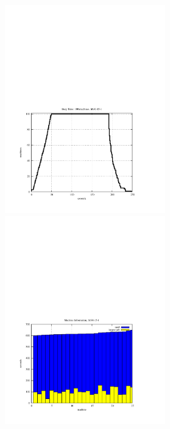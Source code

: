 \documentclass{l4proj}
\begin{document}
\begin{figure}
\begin{center}
\begin{minipage}[t]{0.30\textwidth}
\end{minipage}
\hfill
\begin{minipage}[t]{0.3\textwidth}
\includegraphics[height=9.0cm]{busy-run100-frb30-15-1.pdf}
\end{minipage}
\end{center}
\vspace{-4.0cm}
\begin{center}
\hspace{-1.5cm}
\begin{minipage}[t]{0.3\textwidth}
\includegraphics[height=9.0cm]{machInfo-run25-frb30-15-1.pdf}
\end{minipage}
\hfill
\begin{minipage}[t]{0.3\textwidth}

\end{minipage}
\end{center}
\end{figure}
\end{document}
